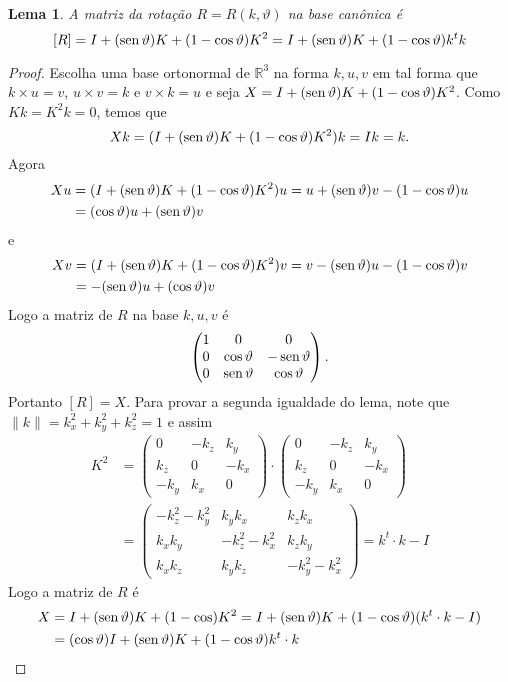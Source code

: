 \documentclass[12pt]{amsart}
\newcommand{\R}{\mathbb R}
\DeclareMathOperator{\sen}{\textrm{\rm sen}}
\newtheorem{lemma}[theorem]{Lema}
\theoremstyle{definition}
\begin{document}
\begin{lemma}
    A matriz da rotação $R=R(k,\vartheta)$ na base canônica é 
    \[
        [R]=I+(\sen\vartheta)K+(1-\cos\vartheta)K^2=I+(\sen\vartheta)K+(1-\cos\vartheta)k^tk
    \]
\end{lemma}
\begin{proof}
    Escolha uma base ortonormal de $\R^3$ na forma $k,u,v$ em tal forma que
    $k\times u = v$, $u\times v=k$ e $v\times k=u$ e 
    seja $X=I+(\sen\vartheta)K+(1-\cos\vartheta)K^2$. Como $Kk=K^2k=0$, temos que
    \[
        Xk=(I+(\sen\vartheta) K+(1-\cos\vartheta)K^2)k=Ik=k.
    \]
    Agora 
    \begin{align*}
        Xu&=(I+(\sen\vartheta) K+(1-\cos\vartheta)K^2)u=u+(\sen\vartheta) v-(1-\cos\vartheta)u\\&=
        (\cos\vartheta) u +(\sen\vartheta) v
    \end{align*}
    e
    \begin{align*}
        Xv&=(I+(\sen\vartheta) K+(1-\cos\vartheta)K^2)v=v-(\sen\vartheta)u-(1-\cos\vartheta)v\\&=
        -(\sen\vartheta)u +(\cos\vartheta)v
    \end{align*}
Logo a matriz de $R$ na base $k,u,v$ é 
\[
    \begin{pmatrix} 1 & 0 & 0 \\ 0 & \cos\vartheta & -\sen\vartheta \\ 0 & \sen\vartheta & \cos\vartheta
    \end{pmatrix}.
\]    
Portanto $[R]=X$. 
Para provar a segunda igualdade do lema, note que 
$\|k\|=k_x^2+k_y^2+k_z^2=1$ e assim
\begin{align*}
    K^2&=\begin{pmatrix} 0 & -k_z & k_y \\ k_z & 0 & -k_x \\ -k_y & k_x & 0\end{pmatrix}\cdot \begin{pmatrix} 0 & -k_z & k_y \\ k_z & 0 & -k_x \\ -k_y & k_x & 0\end{pmatrix}\\
    &=\begin{pmatrix} -k_z^2-k_y^2 & k_yk_x & k_zk_x \\
            k_xk_y & -k_z^2-k_x^2 & k_zk_y\\
            k_xk_z & k_yk_z & -k_y^2-k_x^2
    \end{pmatrix}
    =k^t\cdot k-I
\end{align*}
Logo a matriz de $R$ é 
\begin{align*}
    X&=I+(\sen\vartheta) K+(1-\cos)K^2=I+(\sen\vartheta) K+(1-\cos\vartheta)(k^t\cdot k-I)
    \\&=
    (\cos\vartheta) I+(\sen\vartheta) K+(1-\cos\vartheta)k^t\cdot k\\
\end{align*}
\end{proof}
\end{document}

